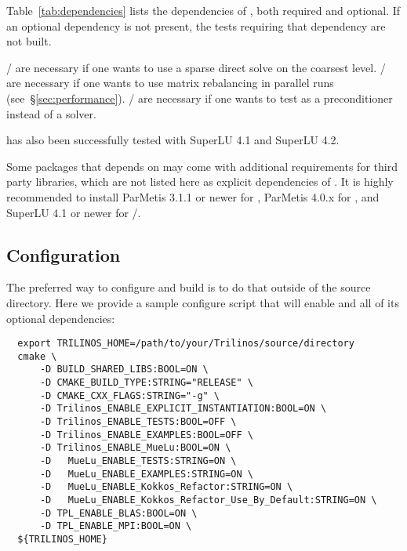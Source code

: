 Table~\ref{tab:dependencies} lists the dependencies of \muelu, both required and
optional. If an optional dependency is not present, the tests requiring that
dependency are not built.

\begin{mycomment}
\amesos{}/\amesostwo{} are necessary if one wants to use a sparse direct solve on the coarsest level.
\zoltan{}/\zoltantwo{} are necessary if one wants to use matrix rebalancing in parallel runs (see~\S\ref{sec:performance}).
\aztecoo{}/\belos{} are necessary if one wants to test \muelu{} as a preconditioner instead of a solver.
\end{mycomment}

\begin{mycomment}
\muelu{} has also been successfully tested with SuperLU 4.1 and SuperLU 4.2.
\end{mycomment}
\begin{mycomment}
Some packages that \muelu{} depends on may come with additional requirements for
third party libraries, which are not listed here as explicit dependencies of \muelu{}.
It is highly recommended to install ParMetis 3.1.1 or newer for \zoltan{},
ParMetis 4.0.x for \zoltantwo{}, and SuperLU 4.1 or newer for
\amesos{}/\amesostwo{}.
\end{mycomment}

\subsection{Configuration}
The preferred way to configure and build \muelu{} is to do that outside of the source directory.
Here we provide a sample configure script that will enable \muelu{} and all of its optional dependencies:
\begin{lstlisting}
  export TRILINOS_HOME=/path/to/your/Trilinos/source/directory
  cmake \
      -D BUILD_SHARED_LIBS:BOOL=ON \
      -D CMAKE_BUILD_TYPE:STRING="RELEASE" \
      -D CMAKE_CXX_FLAGS:STRING="-g" \
      -D Trilinos_ENABLE_EXPLICIT_INSTANTIATION:BOOL=ON \
      -D Trilinos_ENABLE_TESTS:BOOL=OFF \
      -D Trilinos_ENABLE_EXAMPLES:BOOL=OFF \
      -D Trilinos_ENABLE_MueLu:BOOL=ON \
      -D   MueLu_ENABLE_TESTS:STRING=ON \
      -D   MueLu_ENABLE_EXAMPLES:STRING=ON \
      -D   MueLu_ENABLE_Kokkos_Refactor:STRING=ON \
      -D   MueLu_ENABLE_Kokkos_Refactor_Use_By_Default:STRING=ON \
      -D TPL_ENABLE_BLAS:BOOL=ON \
      -D TPL_ENABLE_MPI:BOOL=ON \
  ${TRILINOS_HOME}
\end{lstlisting}


